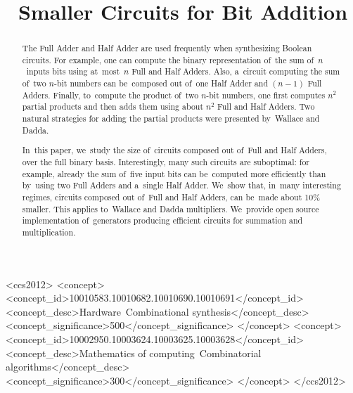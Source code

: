 \documentclass[sigconf, review, anonymous]{acmart}
\begin{document}
\begin{CCSXML}
	<ccs2012>
	<concept>
	<concept_id>10010583.10010682.10010690.10010691</concept_id>
	<concept_desc>Hardware~Combinational synthesis</concept_desc>
	<concept_significance>500</concept_significance>
	</concept>
	<concept>
	<concept_id>10002950.10003624.10003625.10003628</concept_id>
	<concept_desc>Mathematics of computing~Combinatorial algorithms</concept_desc>
	<concept_significance>300</concept_significance>
	</concept>
	</ccs2012>
\end{CCSXML}



\title{Smaller Circuits for Bit Addition}




\begin{abstract}
	The Full Adder and Half Adder are used frequently when synthesizing Boolean circuits.
	For example, one can compute the binary representation of~the sum of~$n$~inputs bits
	using at~most~$n$ Full and Half Adders. Also, a~circuit computing the sum of~two $n$-bit
	numbers can be~composed out of~one Half Adder and $(n-1)$ Full Adders. Finally,
	to~compute the product of~two $n$-bit numbers, one first computes $n^2$ partial products
	and then adds them using about $n^2$ Full and Half Adders. Two natural strategies for
	adding the partial products were presented by~Wallace and Dadda.

	In~this paper, we~study the size of~circuits composed out of~Full and Half Adders,
	over the full binary basis. Interestingly, many such circuits are suboptimal:
	for example, already the sum of~five input bits can be~computed more efficiently
	than by~using two Full Adders and a~single Half Adder. We~show that, in~many interesting
	regimes, circuits composed out of~Full and Half Adders, can be~made about 10\% smaller.
	This applies to~Wallace and Dadda multipliers.
	We~provide open source implementation of~generators producing efficient
	circuits for summation and multiplication.
\end{abstract}


\maketitle
\end{document}
